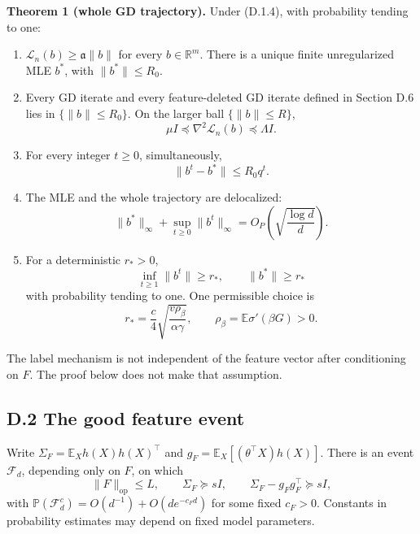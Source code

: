 \documentclass[
  11pt,
  a4paper,
]{article}
\providecommand{\tightlist}{%
  \setlength{\itemsep}{0pt}\setlength{\parskip}{0pt}}
\begin{document}
\textbf{Theorem 1 (whole GD trajectory).} Under (D.1.4), with
probability tending to one:

\begin{enumerate}
\def\labelenumi{\arabic{enumi}.}
\tightlist
\item
  \(\mathcal L_n(b)\geq\mathfrak a\|b\|\) for every \(b\in\mathbb R^m\).
  There is a unique finite unregularized MLE \(b^*\), with
  \(\|b^*\|\leq R_0\).
\item
  Every GD iterate and every feature-deleted GD iterate defined in
  Section D.6 lies in \(\{\|b\|\leq R_0\}\). On the larger ball
  \(\{\|b\|\leq R\}\), \[
  \mu I\preceq\nabla^2\mathcal L_n(b)\preceq\Lambda I.
  \tag{D.1.6}
  \]
\item
  For every integer \(t\geq0\), simultaneously, \[
  \|b^t-b^*\|\leq R_0q^t.
  \tag{D.1.7}
  \]
\item
  The MLE and the whole trajectory are delocalized: \[
  \|b^*\|_\infty+\sup_{t\geq0}\|b^t\|_\infty
     =O_P\!\left(\sqrt{\frac{\log d}{d}}\right).
  \tag{D.1.8}
  \]
\item
  For a deterministic \(r_*>0\), \[
  \inf_{t\geq1}\|b^t\|\geq r_*,\qquad \|b^*\|\geq r_*
  \tag{D.1.9}
  \] with probability tending to one. One permissible choice is \[
  r_* =\frac c4\sqrt{\frac{v\rho_\beta}{\alpha\gamma}},
  \qquad \rho_\beta=\mathbb E\sigma'(\beta G)>0.
  \tag{D.1.10}
  \]
\end{enumerate}

The label mechanism is not independent of the feature vector after
conditioning on \(F\). The proof below does not make that assumption.

\hypertarget{d.2-the-good-feature-event}{%
\subsection{D.2 The good feature
event}\label{d.2-the-good-feature-event}}

Write \(\Sigma_F=\mathbb E_X h(X)h(X)^\top\) and
\(g_F=\mathbb E_X[(\theta^\top X)h(X)]\). There is an event
\(\mathcal F_d\), depending only on \(F\), on which \[
\|F\|_{\mathrm{op}}\leq L,\qquad
\Sigma_F\succeq sI,\qquad
\Sigma_F-g_Fg_F^\top\succeq sI,
\tag{D.2.1}
\] with \(\mathbb P(\mathcal F_d^c)=O(d^{-1})+O(de^{-c_Fd})\) for some
fixed \(c_F>0\). Constants in probability estimates may depend on fixed
model parameters.
\end{document}
